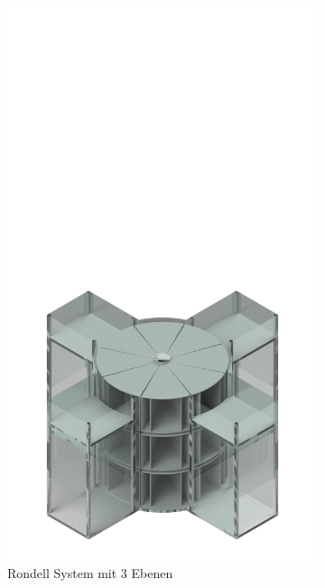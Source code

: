 \begin{figure}[H]
  \centering
  \begin{subfigure}{0.49\textwidth}
    \centering
    \includegraphics[width=\textwidth]{images/rondell_3.png}
    \caption{Rondell System mit 3 Ebenen}
    \label{fig:rondell_3}
  \end{subfigure}
  \begin{subfigure}{0.49\textwidth}
    \centering

\end{subfigure}
\end{figure}
